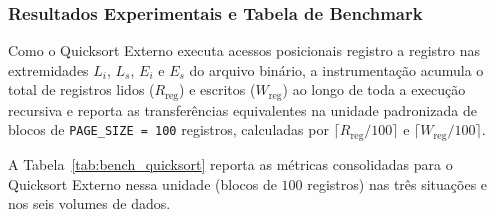 \documentclass[12pt,a4paper]{article}
\begin{document}
\subsubsection{Resultados Experimentais e Tabela de Benchmark}
Como o Quicksort Externo executa acessos posicionais registro a registro nas extremidades $L_i$, $L_s$, $E_i$ e $E_s$ do arquivo binário, a instrumentação acumula o total de registros lidos ($R_{\text{reg}}$) e escritos ($W_{\text{reg}}$) ao longo de toda a execução recursiva e reporta as transferências equivalentes na unidade padronizada de blocos de \texttt{PAGE\_SIZE = 100} registros, calculadas por $\lceil R_{\text{reg}} / 100 \rceil$ e $\lceil W_{\text{reg}} / 100 \rceil$.

A Tabela~\ref{tab:bench_quicksort} reporta as métricas consolidadas para o Quicksort Externo nessa unidade (blocos de $100$ registros) nas três situações e nos seis volumes de dados.
\end{document}

